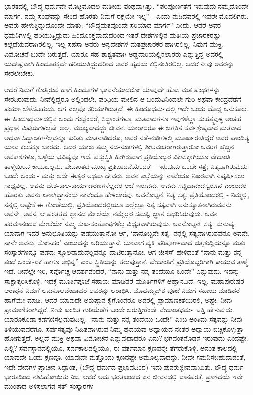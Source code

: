 ಭಾರತದಲ್ಲಿ ಬೌದ್ಧ ಧರ್ಮವೇ ಮೊಟ್ಟಮೊದಲ ಮತೀಯ ಪಂಥವಾಗಿತ್ತು. “ಪರಿಪೂರ್ಣತೆಗೆ ಇರುವುದು ನಮ್ಮದೊಂದೇ ಮಾರ್ಗ. ನಮ್ಮ ಸಂಘವನ್ನು ಸೇರಿದ ಹೊರತು ನಿಮಗೆ ರಕ್ಷೆಯೇ ಇಲ್ಲ” - ಎಂದು ನುಡಿದವರಲ್ಲಿ ಇವರೇ ಮೊದಲಿಗರು. ಅವರು ಹೇಳುತ್ತಿದ್ದುದೊಂದೇ ಮಾತು: “ಬೌದ್ಧಮತವೊಂದೇ ಸರಿಯಾದ ಮಾರ್ಗ” ಎಂದು. ಆದರೆ ಅವರ ಧಮನಿಗಳಲ್ಲಿ ಹರಿಯುತ್ತಿದ್ದುದು ಹಿಂದೂರಕ್ತವಾದುದರಿಂದ ಇತರೆ ದೇಶಗಳಲ್ಲಿನ ಮತೀಯ ಪ್ರಚಾರಕರಷ್ಟು ಕಲ್ಲೆದೆಯವರಾಗಿರಲಿಲ್ಲ. ಇಲ್ಲ ಸಹಸಾ ಅವರು ಅನ್ಯದೇಶಗಳ ಮತಪ್ರಚಾರಕರ ಹಾಗಿರಲಿಲ್ಲ. ನಿಮಗೆ ಮುಕ್ತಿ, ವಿಮೋಚನೆ ಬಂದೇ ಬರುತ್ತದೆ. ಯಾರೂ ಸಹ ಶಾಶ್ವತವಾಗಿ ಅಡ್ಡದಾರಿಯಲ್ಲಿರಲಾರರು ಎನ್ನುತ್ತಿದ್ದ ಅವರಲ್ಲಿ ಯಥೇಷ್ಟವಾಗಿ ಹಿಂದೂರಕ್ತವೇ ಹರಿಯುತ್ತಿದ್ದುದರಿಂದ ಅವರ ಹೃದಯ ಕಲ್ಲಿನಂತಿರಲಿಲ್ಲ. ಆದರೆ ನೀವು ಅವರನ್ನು ಸೇರಲೇಬೇಕು.

ಆದರೆ ನಿಮಗೆ ಗೊತ್ತಿರುವ ಹಾಗೆ ಹಿಂದೂಗಳ ಭಾವನೆಯಾದರೋ ಯಾವುದೇ ಹೊಸ ಮತ ಪಂಥಗಳನ್ನು ಸೇರದಿರುವುದು. ನೀವೆಲ್ಲಿದ್ದರೂ ಅಲ್ಲಿಂದಲೇ, ಪರಿಧಿಯ ಮೇಲಿನ ಆ ಬಿಂದುವಿನಿಂದಲೇ ಗುರಿ ಅಥವಾ ಕೇಂದ್ರದೆಡೆಗೆ ಪಯಣ ಬೆಳೆಸಬಹುದು. ಆಗ ಎಲ್ಲವೂ ಸರಿಯಾಗಿರುತ್ತದೆ. ಈ ಹಿಂದೂಧರ್ಮದಲ್ಲಿ ಇದೇ ಒಂದು ದೊಡ್ಡ ಅನುಕೂಲ. ಈ ಹಿಂದೂಧರ್ಮದಲ್ಲಿನ ಒಂದು ಗುಟ್ಟೆಂದರೆ, ಸಿದ್ಧಾಂತಗಳೂ, ಮತವಾದಗಳೂ ಇವುಗಳೆಲ್ಲಾ ಮಹತ್ತ್ವವುಳ್ಳ ಅಂತಹ ಪ್ರಧಾನ ವಿಷಯಗಳಲ್ಲವೇ ಅಲ್ಲ. ಮುಖ್ಯವಾದದ್ದು ಜೀವನ. ಯಾರಾದರೂ ಈ ಜಗತ್ತಿನ ಸರ್ವಶ್ರೇಷ್ಠವಾದ ಮತವಾದ ಅಥವಾ ಸಿದ್ಧಾಂತಗಳೆಲ್ಲವನ್ನೂ ಕುರಿತು ಮಾತನಾಡಿದರೂ, ಅವರ ನಡೆ-ನುಡಿಗಳಲ್ಲಿ ಮೂರ್ಖರಂತಿದ್ದರೆ ಅವರ ಪಾಂಡಿತ್ಯ ಯಾವ ಕೆಲಸಕ್ಕೂ ಬಾರದು. ಆದರೆ ಯಾರು ತಮ್ಮ ನಡೆ-ನುಡಿಗಳಲ್ಲಿ ಶೀಲವಂತರಾಗಿರುತ್ತಾರೋ ಅವರಿಗೆ ಹೆಚ್ಚಿನ ಅವಕಾಶಗಳೂ, ಒಳ್ಳೆಯ ಭವಿಷ್ಯವೂ ಇದೆ. ವಸ್ತುಸ್ಥಿತಿ ಹೀಗಿರುವಾಗ ಪ್ರತಿಯೊಬ್ಬರ ವಿಕಾಸಕ್ಕಾಗಿಯೂ ವೇದಾಂತಿ ತಾಳ್ಮೆಯಿಂದ ಕಾಯಬಲ್ಲನು. ವೇದಾಂತದ ಮುಖ್ಯ ಪ್ರತಿಪಾದನೆಯೆಂದರೆ - ಇರುವುದು ಒಂದೇ ಸತ್ತೆ; ನಿತ್ಯವಾಗಿರುವುದು ಒಂದೇ ಒಂದು - ಮತ್ತು ಅದೇ ಈಶ್ವರ ಅಥವಾ ದೇವರು. ಅವನ ಎಲ್ಲೆಯನ್ನು ನಾವೆಂದೂ ನಿಖರವಾಗಿ ನಿಷ್ಕರ್ಷಿಸಲು ಸಾಧ್ಯವಿಲ್ಲ. ಅವನು ದೇಶ-ಕಾಲ-ಕಾರ್ಯಕಾರಣಗಳೆಲ್ಲದರ ಆಚೆ ಇರುವನು. ಅವನು ಸಚ್ಚಿದಾನಂದಸ್ವರೂಪ ಎಂಬುದರ ಹೊರತು ಅವನು ಏನಾಗಿದ್ದಾನೆಂದು ನಾವೆಂದೂ ಹೇಳಲಾರೆವು. ಅವನೊಬ್ಬನೇ ನಿತ್ಯ ಸತ್ಯ. ಪ್ರತಿಯೊಂದರಲ್ಲಿ - ನಿಮ್ಮಲ್ಲಿ, ನನ್ನಲ್ಲಿ ಅಷ್ಟೇಕೆ ಈ ಗೋಡೆಯಲ್ಲಿ, ಪ್ರತಿಯೊಂದರಲ್ಲಿಯೂ ಎಲ್ಲೆಲ್ಲೂ ನಿತ್ಯ ಸತ್ಯವಾಗಿ ಅನುಸ್ಯೂತನಾಗಿರುವವನು ಅವನೇ. ಅವನ, ಆ ಪರತತ್ತ್ವದ ಜ್ಞಾನದ ಮೇಲೆಯೇ ನಮ್ಮೆಲ್ಲರ ಸಮಷ್ಟಿ ಜ್ಞಾನ ಆಧರಿಸಿರುವುದು. ಅವನ ಪರಮಾನಂದದ ಮೇಲೆಯೇ ನಮ್ಮ ಸುಖ-ಸಂತೋಷಗಳೆಲ್ಲ ವಿಧೃತವಾಗಿರುವುದು. ಅವನೊಬ್ಬನೇ ಸತ್ಯ. ಮನುಷ್ಯ ಯಾವಾಗ ಇದರ ಅನುಭೂತಿಯನ್ನು ಪಡೆಯುತ್ತಾನೋ ಆಗ, ‘ನಾನೊಬ್ಬನೇ ಸತ್ಯ. ನನ್ನಲ್ಲಿ ಸತ್ಯವಾಗಿರುವವನೂ ಅವನೇ. ನಾನೇ ಅವನು, ಸೋಽಹಂ’ ಎಂಬುದನ್ನು ಅರಿಯುತ್ತಾನೆ. ಯಾವಾಗ ವ್ಯಕ್ತಿ ಪರಿಪೂರ್ಣವಾದ ಚಿತ್ತಶುದ್ದಿಯನ್ನೂ ಮತ್ತು ಸಂಸ್ಕಾರಗಳನ್ನೂ ಪಡೆದು ಸ್ಥೂಲವಾದುದೆಲ್ಲವನ್ನೂ ದಾಟಿರುತ್ತಾನೋ, ಆಗ ಜೀಸಸ್ ಹೇಳಿದಂತೆ “ನಾನು ಮತ್ತು ನನ್ನ ತಂದೆ ಒಂದೇ-ಏಕ ಹಾಗೂ ಅಭಿನ್ನ” ಎಂಬ ಸ್ಥಿತಿಯನ್ನು ತಲುಪುತ್ತಾನೆ. ವೇದಾಂತಿಗೆ ಪ್ರತಿಯೊಬ್ಬರಿಗಾಗಿ ಕಾಯುವ ತಾಳ್ಮೆ ಇದೆ. ನೀವೆಲ್ಲೇ ಇರಿ, ಸರ್ವೊಚ್ಚ ಆದರ್ಶವೆಂದರೆ, “ನಾನು ಮತ್ತು ನನ್ನ ತಂದೆಯೂ ಒಂದೇ” ಎನ್ನುವುದು. ಇದನ್ನು ಸಾಕ್ಷಾತ್ಕರಿಸಿಕೊಳ್ಳಿ. ಇದಕ್ಕೆ ಮೂರ್ತಿಪೂಜೆ ಸಹಾಯ ಮಾಡಿದರೆ ಮೂರ್ತಿಗಳಿಗೆ ಆಹ್ವಾನವಿದೆ. ಇಲ್ಲ, ಮಹಾಪುರುಷರ ಆರಾಧನೆ ನಿಮಗೆ ಅನುಕೂಲವೆಂದಾದರೆ ಅವರನ್ನು ಆರಾಧಿಸಿ. ಮೊಹಮ್ಮದ್‌ನ ಪೂಜೆ ನಿಮಗೆ ಸಹಾಯ ಮಾಡಿದರೆ ಹಾಗೆಯೇ ಮಾಡಿ. ಆದರೆ ಯಾವುದೇ ಅನುಷ್ಠಾನ ಕೈಗೊಂಡರೂ ಅದರಲ್ಲಿ ಪ್ರಾಮಾಣಿಕತೆಯಿರಲಿ, ಅಷ್ಟೇ. ನೀವು ಪ್ರಾಮಾಣಿಕರಾಗಿದ್ದರೆ, ನೀವು ಖಂಡಿತ ಗುರಿಯೆಡೆಗೆ ಬಂದೇ ಬರುತ್ತೀರೆಂದೇ ವೇದಾಂತಧರ್ಮ ಒತ್ತಿ ಹೇಳುವುದು. ಯಾರೂಕೂಡಾ ಕಡೆಗಣಿಸಲ್ಪಡುವುದಿಲ್ಲ. “ನಾನು ಮತ್ತು ನನ್ನ ತಂದೆಯು ಒಂದೇ” ಎಂಬ ಅಂತಿಮ ಸತ್ಯವನ್ನು ನೀವು ತಿಳಿಯುವವರೆಗೂ, ಸರ್ವಸತ್ಯವೂ ನಿಹಿತವಾಗಿರುವ ನಿಮ್ಮ ಹೃದಯವು ಅಧ್ಯಾಯದ ನಂತರ ಅಧ್ಯಾಯ ಬಿಚ್ಚಿಕೊಳ್ಳುತ್ತಾ ಹೋಗುತ್ತದೆ. ಅಲ್ಲದೆ ಮುಕ್ತಿ ಅಥವಾ ವಿಮೋಚನೆ ಎನ್ನುವುದಾದರೂ ಏನು? ಭಗವಂತನೊಡನೆ ಇರುವುದು ಎಂದಷ್ಟೇ. ಎಲ್ಲಿ? ಸರ್ವಸ್ಥಾನದಲ್ಲಿಯೂ, ಸರ್ವಕಾಲದಲ್ಲಿಯೂ, ಈ ವರ್ತಮಾನ ಕ್ಷಣವನ್ನೇ ತೆಗೆದುಕೊಳ್ಳಿ. ಅನಂತ ಕಾಲದಲ್ಲಿ ಯಾವುದೇ ಒಂದು ಕ್ಷಣವೂ, ಯಾವುದೇ ಮತ್ತೊಂದು ಕ್ಷಣದಷ್ಟೇ ಅಮೂಲ್ಯವಾದದ್ದು. ನೀವೇ ಗಮನಿಸಬಹುದಾದಂತೆ, ಇದೇ ವೇದಗಳ ಪ್ರಾಚೀನ ಸಿದ್ಧಾಂತ, (ಬೌದ್ಧ ಧರ್ಮದ ಪ್ರಭಾವದಿಂದ) ಇದು ಪುನರುಜ್ಜೀವವಾಯಿತು. ಬೌದ್ಧ ಧರ್ಮ ಭಾರತದಿಂದ ನಶಿಸಿಹೋಯಿತು ನಿಜ. ಆದರೆ ಅದು ಭರತಖಂಡದ ಜನ ಜೀವನದಲ್ಲಿ ದಾನಪರತೆ, ಪ್ರಾಣಿದಯೆ ಇವೇ ಮುಂತಾದ ಅಳಿಸಲಾಗದ ಸತ್ ಸಂಸ್ಕಾರಗಳ 